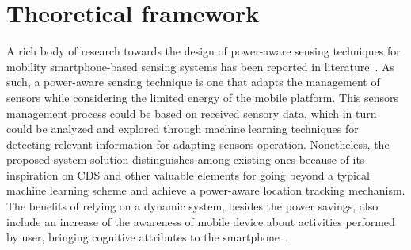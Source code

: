 \documentclass[ENG,PhD]{cinvestav}
\begin{document}
%                                                                                                                                                                             
\section{Theoretical framework}
\label{sec:theoretical-framework} 
A rich body of research towards the design of power-aware sensing techniques for mobility smartphone-based sensing systems has been reported in literature~\cite{Perez-Torres2016}.
As such, a power-aware sensing technique is one that adapts the management of sensors while considering the limited energy of the mobile platform.
This sensors management process could be based on received sensory data, which in turn could be analyzed and explored through machine learning techniques for detecting relevant information for adapting sensors operation.
Nonetheless, the proposed system solution distinguishes among existing ones because of its inspiration on CDS and other valuable elements for going beyond a typical machine learning scheme and achieve a power-aware location tracking mechanism.
The benefits of relying on a dynamic system, besides the power savings, also include an increase of the awareness of mobile device about activities performed by user, bringing cognitive attributes to the smartphone~\cite{Campbell2012}.
\end{document}
